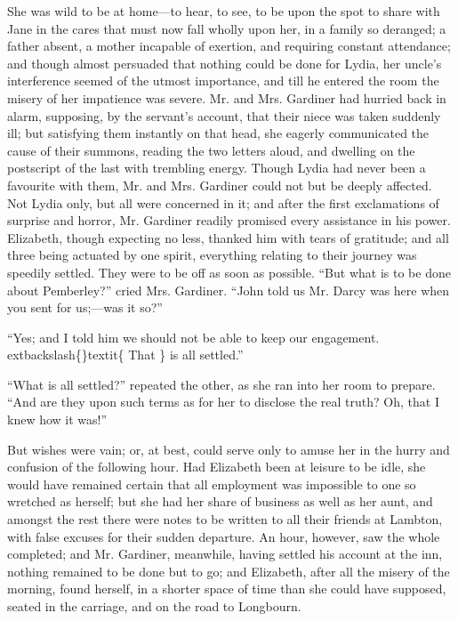 \documentclass[10pt]{book}
\begin{document}
   She was wild to be at home—to hear, to see, to be upon the spot to
share with Jane in the cares that must now fall wholly upon her, in a
family so deranged; a father absent, a mother incapable of exertion, and
requiring constant attendance; and though almost persuaded that nothing
could be done for Lydia, her uncle’s interference seemed of the utmost
importance, and till he entered the room the misery of her impatience
was severe. Mr. and Mrs. Gardiner had hurried back in alarm, supposing,
by the servant’s account, that their niece was taken suddenly ill; but
satisfying them instantly on that head, she eagerly communicated the
cause of their summons, reading the two letters aloud,
   and dwelling on
the postscript of the last with trembling energy. Though Lydia had never
been a favourite with them, Mr. and Mrs. Gardiner could not but be
deeply affected. Not Lydia only, but all were concerned in it; and after
the first exclamations of surprise and horror, Mr. Gardiner readily
promised every assistance in his power. Elizabeth, though expecting no
less, thanked him with tears of gratitude; and all three being actuated
by one spirit, everything relating to their journey was speedily
settled. They were to be off as soon as possible. “But what is to be
done about Pemberley?” cried Mrs. Gardiner. “John told us Mr. Darcy was
here when you sent for us;—was it so?”
  

   “Yes; and I told him we should not be able to keep our engagement.
   	extbackslash\{\}textit\{
    That
   \}
   is all settled.”
  

   “What is all settled?” repeated the other, as she ran into her room to
prepare. “And are they upon such terms as for her to disclose the real
truth? Oh, that I knew how it was!”
  

   But wishes were vain; or, at best, could serve only to amuse her in the
hurry and confusion of the following hour. Had Elizabeth been at leisure
to be idle, she would have remained certain that all employment was
impossible to one so wretched as herself; but she had her share of
business as well as her aunt, and amongst the rest there were notes to
be written to all their friends at Lambton, with false excuses for their
sudden departure. An hour, however, saw the whole completed; and Mr.
Gardiner, meanwhile, having settled his account at the inn, nothing
remained to be done but to go; and Elizabeth, after all the misery of
the morning, found herself, in a shorter space of time than she could
have supposed, seated in the carriage, and on the road to Longbourn.
  
\end{document}
